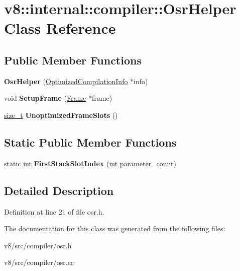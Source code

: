 \hypertarget{classv8_1_1internal_1_1compiler_1_1OsrHelper}{}\section{v8\+:\+:internal\+:\+:compiler\+:\+:Osr\+Helper Class Reference}
\label{classv8_1_1internal_1_1compiler_1_1OsrHelper}
\subsection*{Public Member Functions}
\begin{DoxyCompactItemize}
\item 
\mbox{\label{classv8_1_1internal_1_1compiler_1_1OsrHelper_aeae3a6107dbafe9447ea0d17bc0d22d6}} 
{\bfseries Osr\+Helper} (\mbox{\hyperlink{classv8_1_1internal_1_1OptimizedCompilationInfo}{Optimized\+Compilation\+Info}} $\ast$info)
\item 
\mbox{\label{classv8_1_1internal_1_1compiler_1_1OsrHelper_a5061cacc2fb9df08e51206958fd0fafc}} 
void {\bfseries Setup\+Frame} (\mbox{\hyperlink{classv8_1_1internal_1_1compiler_1_1Frame}{Frame}} $\ast$frame)
\item 
\mbox{\label{classv8_1_1internal_1_1compiler_1_1OsrHelper_ad13873aecfcfbff35799cab4b4e0df92}} 
\mbox{\hyperlink{classsize__t}{size\+\_\+t}} {\bfseries Unoptimized\+Frame\+Slots} ()
\end{DoxyCompactItemize}
\subsection*{Static Public Member Functions}
\begin{DoxyCompactItemize}
\item 
\mbox{\label{classv8_1_1internal_1_1compiler_1_1OsrHelper_af29916c27892b27a638e383c5214b090}} 
static \mbox{\hyperlink{classint}{int}} {\bfseries First\+Stack\+Slot\+Index} (\mbox{\hyperlink{classint}{int}} parameter\+\_\+count)
\end{DoxyCompactItemize}


\subsection{Detailed Description}


Definition at line 21 of file osr.\+h.



The documentation for this class was generated from the following files\+:\begin{DoxyCompactItemize}
\item 
v8/src/compiler/osr.\+h\item 
v8/src/compiler/osr.\+cc\end{DoxyCompactItemize}
